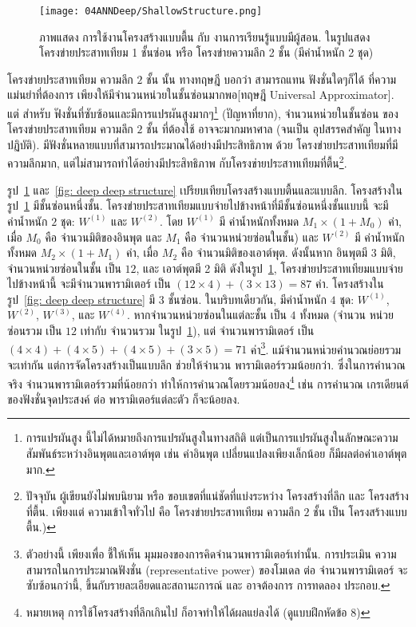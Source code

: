 %
\begin{figure}
\centering

\texttt{[image: 04ANNDeep/ShallowStructure.png]}
\label{fig: deep shallow structure}

\caption{ภาพแสดง การใช้งานโครงสร้างแบบตื้น กับ งานการเรียนรู้แบบมีผู้สอน.
  ในรูปแสดง โครงข่ายประสาทเทียม 1 ชั้นซ่อน หรือ โครงข่ายความลึก 2 ชั้น (มีค่าน้ำหนัก 2 ชุด)}

\end{figure}
%

โครงข่ายประสาทเทียม ความลึก $2$ ชั้น นั้น ทางทฤษฎี บอกว่า สามารถแทน ฟังชั่นใดๆก็ได้ ที่ความแม่นยำที่ต้องการ เพียงให้มีจำนวนหน่วยในชั้นซ่อนมากพอ\cite{Cybenko1989a, Hornik1991a, Bishop2006a}[ทฤษฎี Universal Approximator].
แต่ สำหรับ ฟังชั่นที่ซับซ้อนและมีการแปรผันสูงมากๆ\footnote{
การแปรผันสูง นี้ไม่ได้หมายถึงการแปรผันสูงในทางสถิติ แต่เป็นการแปรผันสูงในลักษณะความสัมพันธ์ระหว่างอินพุตและเอาต์พุต เช่น ค่าอินพุต เปลี่ยนแปลงเพียงเล็กน้อย ก็มีผลต่อค่าเอาต์พุต มาก.
} (ปัญหาที่ยาก), จำนวนหน่วยในชั้นซ่อน ของ โครงข่ายประสาทเทียม ความลึก $2$ ชั้น ที่ต้องใช้ อาจจะมากมหาศาล (จนเป็น อุปสรรคสำคัญ ในทางปฏิบัติ).
มีฟังชั่นหลายแบบที่สามารถประมาณได้อย่างมีประสิทธิภาพ ด้วย โครงข่ายประสาทเทียมที่มีความลึกมาก,
แต่ไม่สามารถทำได้อย่างมีประสิทธิภาพ กับโครงข่ายประสาทเทียมที่ตื้น\footnote{
ปัจจุบัน ผู้เขียนยังไม่พบนิยาม หรือ ขอบเขตที่แน่ชัดที่แบ่งระหว่าง โครงสร้างที่ลึก และ โครงสร้างที่ตื้น.
เพียงแต่ ความเข้าใจทั่วไป คือ โครงข่ายประสาทเทียม ความลึก $2$ ชั้น เป็น โครงสร้างแบบตื้น.)
}.

รูป~\ref{fig: deep shallow structure} และ~\ref{fig: deep deep structure} เปรียบเทียบโครงสร้างแบบตื้นและแบบลึก.
โครงสร้างในรูป~\ref{fig: deep shallow structure} มีชั้นซ่อนหนึ่งชั้น. โครงข่ายประสาทเทียมแบบจ่ายไปข้างหน้าที่มีชั้นซ่อนหนึ่งชั้นแบบนี้ จะมี ค่าน้ำหนัก $2$ ชุด: $W^{(1)}$ และ $W^{(2)}$.
โดย $W^{(1)}$ มี ค่าน้ำหนักทั้งหมด $M_1 \times (1 + M_0)$ ค่า, เมื่อ $M_0$ คือ จำนวนมิติของอินพุต และ $M_1$ คือ จำนวนหน่วยซ่อนในชั้น)
และ $W^{(2)}$ มี ค่าน้ำหนักทั้งหมด $M_2 \times (1 + M_1)$ ค่า, เมื่อ $M_2$ คือ จำนวนมิติของเอาต์พุต.
ดังนั้นหาก อินพุตมี $3$ มิติ, จำนวนหน่วยซ่อนในชั้น เป็น $12$, และ เอาต์พุตมี 2 มิติ ดังในรูป~\ref{fig: deep shallow structure}, 
โครงข่ายประสาทเทียมแบบจ่ายไปข้างหน้านี้ จะมีจำนวนพารามิเตอร์ เป็น $(12 \times 4) + (3 \times 13) = 87$ ค่า.
โครงสร้างในรูป~\ref{fig: deep deep structure} มี $3$ ชั้นซ่อน.
ในบริบทเดียวกัน, มีค่าน้ำหนัก $4$ ชุด: $W^{(1)}$, $W^{(2)}$, $W^{(3)}$, และ $W^{(4)}$.
หากจำนวนหน่วยซ่อนในแต่ละชั้น เป็น $4$ ทั้งหมด (จำนวน หน่วยซ่อนรวม เป็น $12$ เท่ากับ จำนวนรวม ในรูป~\ref{fig: deep shallow structure}), 
แต่ จำนวนพารามิเตอร์ เป็น $(4 \times 4) + (4 \times 5) + (4 \times 5) + (3 \times 5) = 71$ ค่า\footnote{
ตัวอย่างนี้ เพียงเพื่อ ชี้ให้เห็น มุมมองของการคิดจำนวนพารามิเตอร์เท่านั้น.
การประเมิน ความสามารถในการประมาณฟังชั่น (representative power) ของโมเดล ต่อ จำนวนพารามิเตอร์ จะซับซ้อนกว่านี้, ขึ้นกับรายละเอียดและสถานะการณ์ และ อาจต้องการ การทดลอง ประกอบ.
}.
แม้จำนวนหน่วยคำนวณย่อยรวมจะเท่ากัน แต่การจัดโครงสร้างเป็นแบบลึก ช่วยให้จำนวน พารามิเตอร์รวมน้อยกว่า.
ซึ่งในการคำนวณจริง จำนวนพารามิเตอร์รวมที่น้อยกว่า ทำให้การคำนวณโดยรวมน้อยลง\footnote{
หมายเหตุ การใช้โครงสร้างที่ลึกเกินไป ก็อาจทำให้ได้ผลแย่ลงได้ (ดูแบบฝึกหัดข้อ 8)
} เช่น การคำนวณ เกรเดียนต์ของฟังชั่นจุดประสงค์ ต่อ พารามิเตอร์แต่ละตัว ก็จะน้อยลง.

